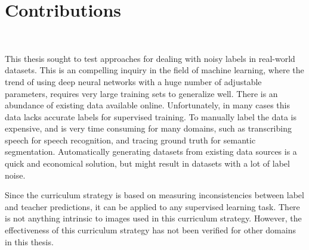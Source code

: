 \section{Contributions}~\label{cont}
\label{sec:Contributions}


This thesis sought to test approaches for dealing with noisy labels in real-world datasets. This is an compelling inquiry in the field of machine learning, where the trend of using deep neural networks with a huge number of adjustable parameters, requires very large training sets to generalize well. There is an abundance of existing data available online. Unfortunately, in many cases this data lacks accurate labels for supervised training. To manually label the data is expensive, and is very time consuming for many domains, such as transcribing speech for speech recognition, and tracing ground truth for semantic segmentation. Automatically generating datasets from existing data sources is a quick and economical solution, but might result in datasets with a lot of label noise.\\


Since the curriculum  strategy is based on measuring inconsistencies between label and teacher predictions, it can be applied to any supervised learning task. There is not anything intrinsic to images used in this curriculum strategy. However, the effectiveness of this curriculum strategy has not been verified for other domains in this thesis.\\
